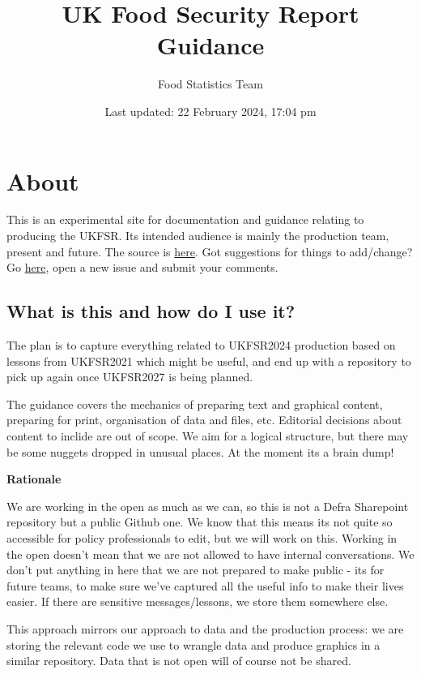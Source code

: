 \documentclass[
]{book}
\title{UK Food Security Report Guidance}
\author{Food Statistics Team}
\date{Last updated: 22 February 2024, 17:04 pm}
\begin{document}
\maketitle

{
\setcounter{tocdepth}{1}
\tableofcontents
}
\hypertarget{about}{%
\chapter{About}\label{about}}

This is an experimental site for documentation and guidance relating to
producing the UKFSR. Its intended audience is mainly the production team,
present and future. The source is
\href{https://github.com/FoodchainStats/ukfsr-docs}{here}. Got suggestions for things
to add/change? Go \href{https://github.com/FoodchainStats/ukfsr-docs/issues}{here},
open a new issue and submit your comments.

\hypertarget{what-is-this-and-how-do-i-use-it}{%
\section{What is this and how do I use it?}\label{what-is-this-and-how-do-i-use-it}}

The plan is to capture everything related to UKFSR2024 production based on
lessons from UKFSR2021 which might be useful, and end up with a repository to
pick up again once UKFSR2027 is being planned.

The guidance covers the mechanics of preparing text and graphical content,
preparing for print, organisation of data and files, etc. Editorial decisions
about content to inclide are out of scope. We aim for a logical structure, but
there may be some nuggets dropped in unusual places. At the moment its a brain
dump!

\textbf{Rationale}

We are working in the open as much as we can, so this is not a Defra Sharepoint
repository but a public Github one. We know that this means its not quite so
accessible for policy professionals to edit, but we will work on this. Working
in the open doesn't mean that we are not allowed to have internal conversations.
We don't put anything in here that we are not prepared to make public - its for
future teams, to make sure we've captured all the useful info to make their
lives easier. If there are sensitive messages/lessons, we store them somewhere
else.

This approach mirrors our approach to data and the production process: we are
storing the relevant code we use to wrangle data and produce graphics in a
similar repository. Data that is not open will of course not be shared.
\end{document}
